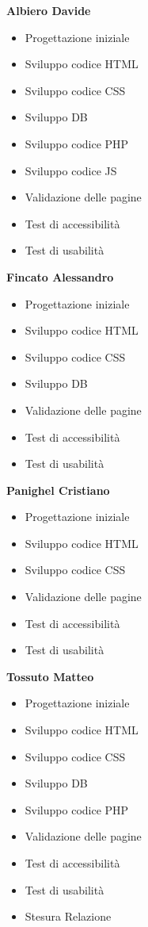 	\textbf{Albiero Davide}
	\begin{itemize}
		\item Progettazione iniziale
		\item Sviluppo codice HTML
		\item Sviluppo codice CSS
		\item Sviluppo DB
		\item Sviluppo codice PHP
		\item Sviluppo codice JS
		\item Validazione delle pagine
		\item Test di accessibilità
		\item Test di usabilità
	\end{itemize}	
	\textbf{Fincato Alessandro}
	\begin{itemize}
		\item Progettazione iniziale
		\item Sviluppo codice HTML
		\item Sviluppo codice CSS
		\item Sviluppo DB
		\item Validazione delle pagine
		\item Test di accessibilità
		\item Test di usabilità
	\end{itemize}	
	\textbf{Panighel Cristiano}
	\begin{itemize}
		\item Progettazione iniziale
		\item Sviluppo codice HTML
		\item Sviluppo codice CSS
		\item Validazione delle pagine
		\item Test di accessibilità
		\item Test di usabilità
	\end{itemize}	
	\textbf{Tossuto Matteo}
	\begin{itemize}
		\item Progettazione iniziale
		\item Sviluppo codice HTML
		\item Sviluppo codice CSS
		\item Sviluppo DB
		\item Sviluppo codice PHP
		\item Validazione delle pagine
		\item Test di accessibilità
		\item Test di usabilità
		\item Stesura Relazione
	\end{itemize}

